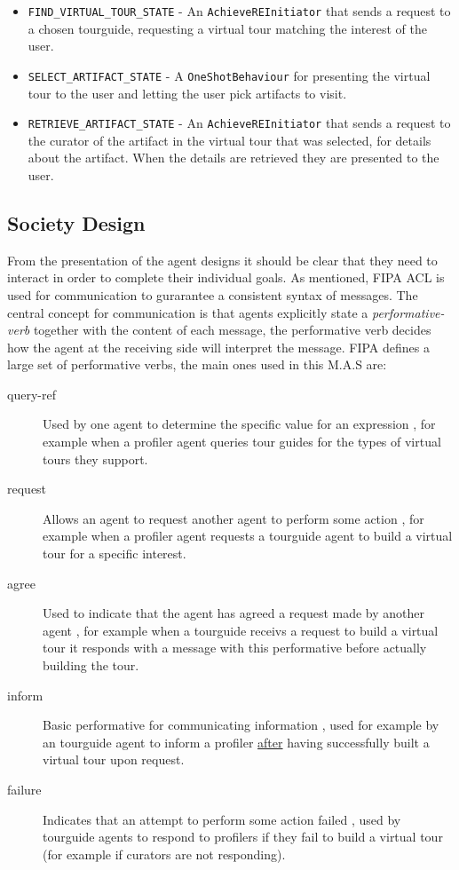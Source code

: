 \documentclass[a4paper, 11pt]{article}
\begin{document}
\begin{itemize}
\begin{itemize}
\begin{itemize}
\item \texttt{FIND\_VIRTUAL\_TOUR\_STATE} - An \texttt{AchieveREInitiator} that sends a request to a chosen tourguide, requesting a virtual tour matching the interest of the user.
\item \texttt{SELECT\_ARTIFACT\_STATE} - A \texttt{OneShotBehaviour} for presenting the virtual tour to the user and letting the user pick artifacts to visit.
\item \texttt{RETRIEVE\_ARTIFACT\_STATE} - An \texttt{AchieveREInitiator} that sends a request to the curator of the artifact in the virtual tour that was selected, for details about the artifact. When the details are retrieved they are presented to the user.
\end{itemize}
\end{itemize}
\end{itemize}
\subsection*{Society Design}
From the presentation of the agent designs it should be clear that they need to interact in order to complete their individual goals. As mentioned, FIPA ACL is used for communication to gurarantee a consistent syntax of messages. The central concept for communication is that agents explicitly state a \textit{performative-verb} together with the content of each message, the performative verb decides how the agent at the receiving side will interpret the message. FIPA defines a large set of performative verbs, the main ones used in this M.A.S are:
\begin{description}
\item[query-ref] Used by one agent to determine the specific value for an expression \citep{coursebook}, for example when a profiler agent queries tour guides for the types of virtual tours they support.
\item[request] Allows an agent to request another agent to perform some action \citep{coursebook}, for example when a profiler agent requests a tourguide agent to build a virtual tour for a specific interest.
\item[agree] Used to indicate that the agent has agreed a request made by another agent \citep{coursebook}, for example when a tourguide receivs a request to build a virtual tour it responds with a message with this performative before actually building the tour.
\item[inform] Basic performative for communicating information \citep{coursebook}, used for example by an tourguide agent to inform a profiler \underline{after} having successfully built a virtual tour upon request.
\item[failure] Indicates that an attempt to perform some action failed \citep{coursebook}, used by tourguide agents to respond to profilers if they fail to build a virtual tour (for example if curators are not responding).
\end{description}
\end{document}
